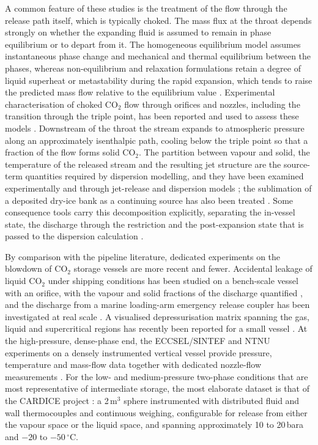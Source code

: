\documentclass[5p,authoryear]{elsarticle}
\begin{document}
A common feature of these studies is the treatment of the flow through the release path itself,
which is typically choked. The mass flux at the throat depends strongly on whether the expanding
fluid is assumed to remain in phase equilibrium or to depart from it. The homogeneous equilibrium
model assumes instantaneous phase change and mechanical and thermal equilibrium between the
phases, whereas non-equilibrium and relaxation formulations retain a degree of liquid superheat
or metastability during the rapid expansion, which tends to raise the predicted mass flow
relative to the equilibrium value \citep{Lopes2018, Brown2013}. Experimental characterisation of
choked CO$_2$ flow through orifices and nozzles, including the transition through the triple
point, has been reported and used to assess these models \citep{Pursell2012, Hammer2022}.
Downstream of the throat the stream expands to atmospheric pressure along an approximately
isenthalpic path, cooling below the triple point so that a fraction of the flow forms solid
CO$_2$. The partition between vapour and solid, the temperature of the released stream and the
resulting jet structure are the source-term quantities required by dispersion modelling, and they
have been examined experimentally and through jet-release and dispersion models
\citep{Toesse2013, Wareing2014, Dixon2012}; the sublimation of a deposited dry-ice bank as a
continuing source has also been treated \citep{Mazzoldi2008}. Some consequence tools carry this
decomposition explicitly, separating the in-vessel state, the discharge through the restriction
and the post-expansion state that is passed to the dispersion calculation \citep{Witlox2012}.

By comparison with the pipeline literature, dedicated experiments on the blowdown of CO$_2$
storage vessels are more recent and fewer. Accidental leakage of liquid CO$_2$ under shipping
conditions has been studied on a bench-scale vessel with an orifice, with the vapour and solid
fractions of the discharge quantified \citep{AlBaroudi2021}, and the discharge from a marine
loading-arm emergency release coupler has been investigated at real scale \citep{AlBaroudi2022}.
A visualised depressurisation matrix spanning the gas, liquid and supercritical regions has
recently been reported for a small vessel \citep{Chen2026}. At the high-pressure, dense-phase end,
the ECCSEL/SINTEF and NTNU experiments on a densely instrumented vertical vessel provide pressure,
temperature and mass-flow data together with dedicated nozzle-flow measurements
\citep{Hoydalsvik2026, Hammer2022}. For the low- and medium-pressure two-phase conditions that are
most representative of intermediate storage, the most elaborate dataset is that of the CARDICE
project \citep{Vaillant2021, Jamois2023}: a 2\,m$^3$ sphere instrumented with distributed fluid
and wall thermocouples and continuous weighing, configurable for release from either the vapour
space or the liquid space, and spanning approximately 10 to 20\,bara and $-20$ to
$-50\,^\circ$C.
\end{document}
